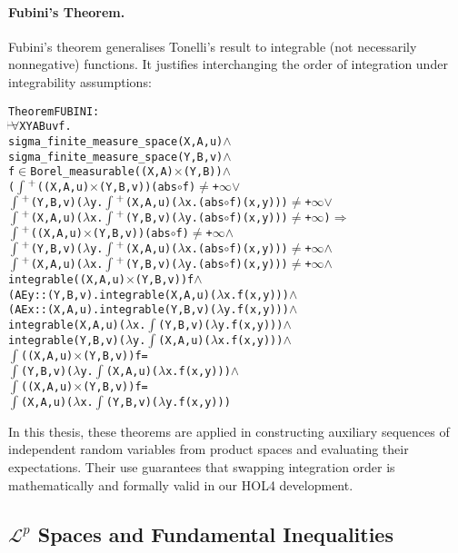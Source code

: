 \paragraph{Fubini's Theorem.}
Fubini’s theorem generalises Tonelli’s result to integrable (not necessarily nonnegative) functions. It justifies interchanging the order of integration under integrability assumptions:
\begin{hol}
\begin{alltt}
Theorem FUBINI :
\(\!\!\!{\turn}\!\!\!\!\) \(\forall\)X Y A B u v f.
sigma\_finite\_measure\_space (X,A,u) \(\land\)
sigma\_finite\_measure\_space (Y,B,v) \(\land\)
f \(\in\) Borel\_measurable ((X,A) \(\times\) (Y,B)) \(\land\)
(\(\int\)\(\sp{+}\) ((X,A,u) \(\times\) (Y,B,v)) (abs \(\circ\) f) \(\ne\) +\(\infty\) \(\lor\)
 \(\int\)\(\sp{+}\) (Y,B,v) (\(\lambda\)y. \(\int\)\(\sp{+}\) (X,A,u) (\(\lambda\)x. (abs \(\circ\) f) (x,y))) \(\ne\) +\(\infty\) \(\lor\)
 \(\int\)\(\sp{+}\) (X,A,u) (\(\lambda\)x. \(\int\)\(\sp{+}\) (Y,B,v) (\(\lambda\)y. (abs \(\circ\) f) (x,y))) \(\ne\) +\(\infty\)) \(\Rightarrow\)
\(\int\)\(\sp{+}\) ((X,A,u) \(\times\) (Y,B,v)) (abs \(\circ\) f) \(\ne\) +\(\infty\) \(\land\)
\(\int\)\(\sp{+}\) (Y,B,v) (\(\lambda\)y. \(\int\)\(\sp{+}\) (X,A,u) (\(\lambda\)x. (abs \(\circ\) f) (x,y))) \(\ne\) +\(\infty\) \(\land\)
\(\int\)\(\sp{+}\) (X,A,u) (\(\lambda\)x. \(\int\)\(\sp{+}\) (Y,B,v) (\(\lambda\)y. (abs \(\circ\) f) (x,y))) \(\ne\) +\(\infty\) \(\land\)
integrable ((X,A,u) \(\times\) (Y,B,v)) f \(\land\)
(AE y::(Y,B,v). integrable (X,A,u) (\(\lambda\)x. f (x,y))) \(\land\)
(AE x::(X,A,u). integrable (Y,B,v) (\(\lambda\)y. f (x,y))) \(\land\)
integrable (X,A,u) (\(\lambda\)x. \(\int\) (Y,B,v) (\(\lambda\)y. f (x,y))) \(\land\)
integrable (Y,B,v) (\(\lambda\)y. \(\int\) (X,A,u) (\(\lambda\)x. f (x,y))) \(\land\)
\(\int\) ((X,A,u) \(\times\) (Y,B,v)) f =
\(\int\) (Y,B,v) (\(\lambda\)y. \(\int\) (X,A,u) (\(\lambda\)x. f (x,y))) \(\land\)
\(\int\) ((X,A,u) \(\times\) (Y,B,v)) f =
\(\int\) (X,A,u) (\(\lambda\)x. \(\int\) (Y,B,v) (\(\lambda\)y. f (x,y)))
\end{alltt}
\end{hol}

In this thesis, these theorems are applied in constructing auxiliary sequences of independent random variables from product spaces and evaluating their expectations. Their use guarantees that swapping integration order is mathematically and formally valid in our HOL4 development.

\subsection{$\mathcal{L}^p$ Spaces and Fundamental Inequalities}

